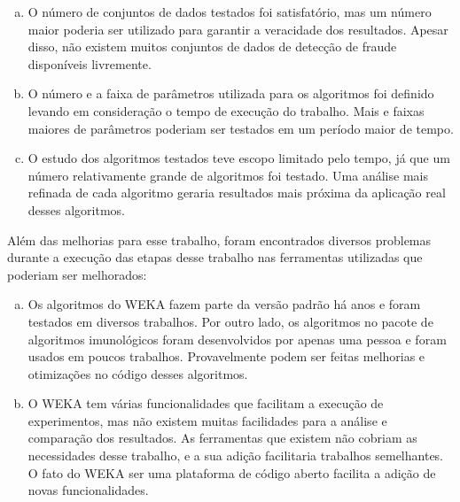 \begin{enumerate}[a)]
    \item O número de conjuntos de dados testados foi satisfatório, mas um número maior poderia ser utilizado para garantir a veracidade dos resultados. Apesar disso, não existem muitos conjuntos de dados de detecção de fraude disponíveis livremente.
    \item O número e a faixa de parâmetros utilizada para os algoritmos foi definido levando em consideração o tempo de execução do trabalho. Mais e faixas maiores de parâmetros poderiam ser testados em um período maior de tempo.
    \item O estudo dos algoritmos testados teve escopo limitado pelo tempo, já que um número relativamente grande de algoritmos foi testado. Uma análise mais refinada de cada algoritmo geraria resultados mais próxima da aplicação real desses algoritmos.
\end{enumerate}

Além das melhorias para esse trabalho, foram encontrados diversos problemas durante a execução das etapas desse trabalho nas ferramentas utilizadas que poderiam ser melhorados:

\begin{enumerate}[a)]
    \item Os algoritmos do WEKA fazem parte da versão padrão há anos e foram testados em diversos trabalhos. Por outro lado, os algoritmos no pacote de algoritmos imunológicos foram desenvolvidos por apenas uma pessoa e foram usados em poucos trabalhos. Provavelmente podem ser feitas melhorias e otimizações no código desses algoritmos.
    \item O WEKA tem várias funcionalidades que facilitam a execução de experimentos, mas não existem muitas facilidades para a análise e comparação dos resultados. As ferramentas que existem não cobriam as necessidades desse trabalho, e a sua adição facilitaria trabalhos semelhantes. O fato do WEKA ser uma plataforma de código aberto facilita a adição de novas funcionalidades.
\end{enumerate}
